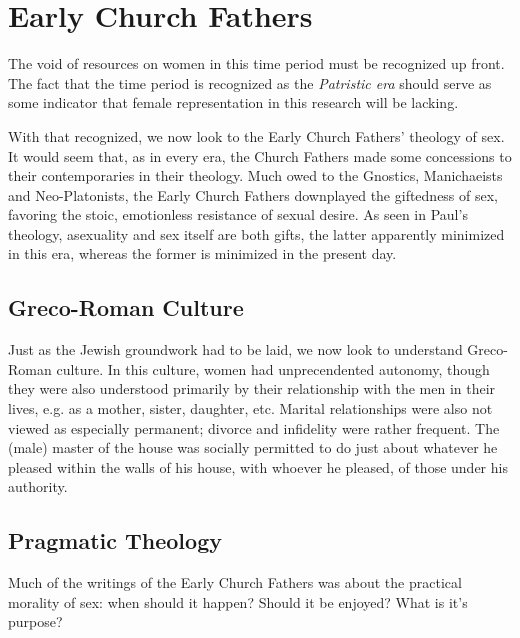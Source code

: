 \documentclass[12pt]{article}
\begin{document}
\section{Early Church Fathers}
    
    \par The void of resources on women in this time period must be recognized
        up front. The fact that the time period is recognized as the \textit{
        Patristic era} should serve as some indicator that female representation
        in this research will be lacking.

    \par With that recognized, we now look to the Early Church Fathers'
        theology of sex. It would seem that, as in every era, the Church
        Fathers made some concessions to their contemporaries in their
        theology\cite{ezra}. Much owed to the Gnostics, Manichaeists and 
        Neo-Platonists, the Early Church Fathers downplayed the giftedness
        of sex, favoring the stoic, emotionless resistance of sexual desire.
        As seen in Paul's theology, asexuality and sex itself are both
        gifts, the latter apparently minimized in this era, whereas the
        former is minimized in the present day.

\subsection{Greco-Roman Culture}

    Just as the Jewish groundwork had to be laid, we now look to understand
    Greco-Roman culture. In this culture, women had unprecendented
    autonomy, though they were also understood primarily by their relationship
    with the men in their lives, e.g. as a mother, sister, daughter, etc.
    Marital relationships were also not viewed as especially permanent; divorce
    and infidelity were rather frequent\cite{kelly19}. The (male) master of
    the house was socially permitted to do just about whatever he pleased
    within the walls of his house, with whoever he pleased, of those
    under his authority.

\subsection{Pragmatic Theology}

    Much of the writings of the Early Church Fathers was about the practical
    morality of sex: when should it happen? Should it be enjoyed? What is
    it's purpose?
\end{document}
